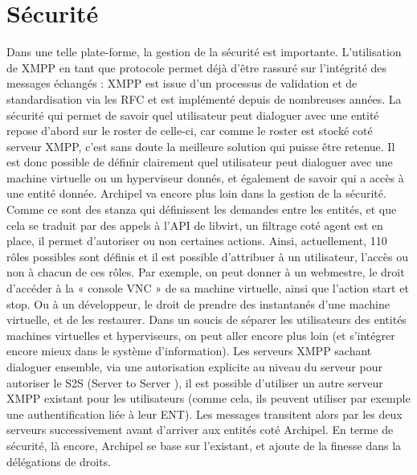     \section{Sécurité}
Dans une telle plate-forme, la gestion de la sécurité est importante. L'utilisation de XMPP en tant que
protocole permet déjà d'être rassuré sur l'intégrité des messages échangés : XMPP est issue d'un
processus de validation et de standardisation via les RFC et est implémenté depuis de nombreuses
années.\newline
La sécurité qui permet de savoir quel utilisateur peut dialoguer avec une entité repose d'abord sur le
roster de celle-ci, car comme le roster est stocké coté serveur XMPP, c'est sans doute la meilleure solution
qui puisse être retenue. Il est donc possible de définir clairement quel utilisateur peut dialoguer avec une
machine virtuelle ou un hyperviseur donnés, et également de savoir qui a accès à une entité donnée.
Archipel va encore plus loin dans la gestion de la sécurité. Comme ce sont des stanza qui définissent les
demandes entre les entités, et que cela se traduit par des appels à l'API de libvirt, un filtrage coté agent
est en place, il permet d'autoriser ou non certaines actions. Ainsi, actuellement, 110 rôles possibles sont
définis et il est possible d'attribuer à un utilisateur, l'accès ou non à chacun de ces rôles. Par exemple, on
peut donner à un webmestre, le droit d’accéder à la « console VNC » de sa machine virtuelle, ainsi que
l'action start et stop. Ou à un développeur, le droit de prendre des instantanés d'une machine virtuelle, et
de les restaurer.\newline
Dans un soucis de séparer les utilisateurs des entités machines virtuelles et hyperviseurs, on peut aller
encore plus loin (et s'intégrer encore mieux dans le système d'information). Les serveurs XMPP sachant
dialoguer ensemble, via une autorisation explicite au niveau du serveur pour autoriser le S2S (Server to
Server ), il est possible d'utiliser un autre serveur XMPP existant pour les utilisateurs (comme cela, ils
peuvent utiliser par exemple une authentification liée à leur ENT). Les messages transitent alors par les
deux serveurs successivement avant d'arriver aux entités coté Archipel.\newline
En terme de sécurité, là encore, Archipel se base sur l'existant, et ajoute de la finesse dans la délégations
de droits.\newline

